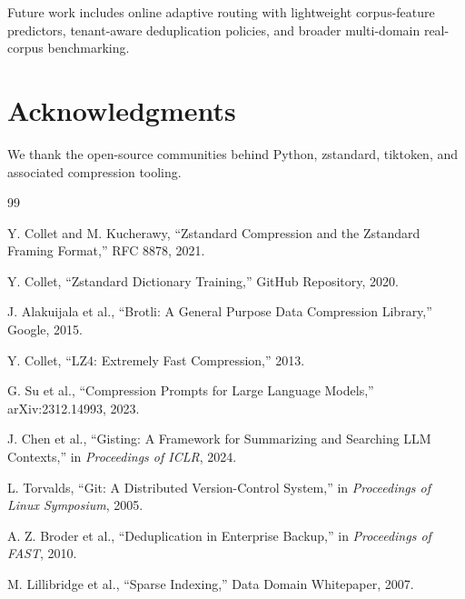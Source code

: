 \documentclass[10pt,conference]{IEEEtran}
\begin{document}
Future work includes online adaptive routing with lightweight corpus-feature predictors, tenant-aware deduplication policies, and broader multi-domain real-corpus benchmarking.

\section*{Acknowledgments}
We thank the open-source communities behind Python, zstandard, tiktoken, and associated compression tooling.

\begin{thebibliography}{99}

 Y. Collet and M. Kucherawy, ``Zstandard Compression and the Zstandard Framing Format,'' RFC 8878, 2021.

 Y. Collet, ``Zstandard Dictionary Training,'' GitHub Repository, 2020.

 J. Alakuijala et al., ``Brotli: A General Purpose Data Compression Library,'' Google, 2015.

 Y. Collet, ``LZ4: Extremely Fast Compression,'' 2013.

 G. Su et al., ``Compression Prompts for Large Language Models,'' arXiv:2312.14993, 2023.

 J. Chen et al., ``Gisting: A Framework for Summarizing and Searching LLM Contexts,'' in \textit{Proceedings of ICLR}, 2024.

 L. Torvalds, ``Git: A Distributed Version-Control System,'' in \textit{Proceedings of Linux Symposium}, 2005.

 A. Z. Broder et al., ``Deduplication in Enterprise Backup,'' in \textit{Proceedings of FAST}, 2010.

 M. Lillibridge et al., ``Sparse Indexing,'' Data Domain Whitepaper, 2007.

\end{thebibliography}
\end{document}
